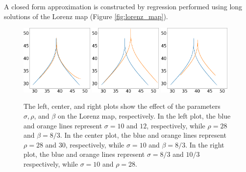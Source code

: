 A closed form approximation is constructed by regression performed using long solutions 
of the Lorenz map (Figure \ref{fig:lorenz_map}). 
\begin{figure}
    \centering
    \includegraphics[width=0.32\textwidth]{lorenz_zmax_sigma.png}
    \hspace{0.005\textwidth}
    \includegraphics[width=0.32\textwidth]{lorenz_zmax_rho.png}
    \hspace{0.005\textwidth}
    \includegraphics[width=0.32\textwidth]{lorenz_zmax_beta.png}
    \caption{
The left, center, and right plots show the effect of the
    parameters $\sigma, \rho$, and $\beta$ on the Lorenz map, respectively.
    In the left plot, the blue and orange lines represent
    $\sigma=10$ and $12$, respectively, while $\rho  = 28$ and $\beta = 8/3.$
    In the center plot, the blue and orange lines represent
    $\rho=28$ and $30$, respectively, while $\sigma = 10$ and $\beta  = 8/3.$ 
    In the right plot, the blue and orange lines represent
    $\sigma=8/3$ and $10/3$ respectively, while $\sigma = 10$ and 
		$\rho = 28.$}
    \label{fig:lorenz_params}
\end{figure}


